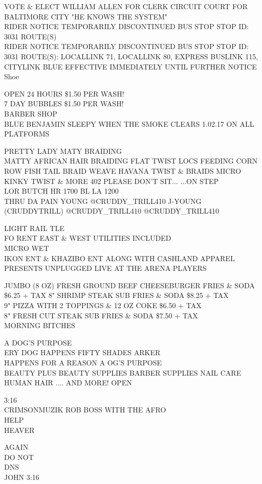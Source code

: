 \documentclass[10pt,letterpaper]{article}
\begin{document}
VOTE \& ELECT WILLIAM ALLEN FOR CLERK CIRCUIT COURT FOR BALTIMORE CITY "HE KNOWS THE SYSTEM"\\
RIDER NOTICE TEMPORARILY DISCONTINUED BUS STOP STOP ID: 3031 ROUTE(S)\\
RIDER NOTICE TEMPORARILY DISCONTINUED BUS STOP STOP ID: 3031 ROUTE(S): LOCALLINK 71, LOCALLINK 80, EXPRESS BUSLINK 115, CITYLINK BLUE EFFECTIVE IMMEDIATELY UNTIL FURTHER NOTICE\\
Shoe

OPEN 24 HOURS \$1.50 PER WASH!\\
7 DAY BUBBLES \$1.50 PER WASH!\\
BARBER SHOP\\
BLUE BENJAMIN SLEEPY WHEN THE SMOKE CLEARS 1.02.17 ON ALL PLATFORMS

PRETTY LADY MATY BRAIDING\\
MATTY AFRICAN HAIR BRAIDING FLAT TWIST LOCS FEEDING CORN ROW FISH TAIL BRAID WEAVE HAVANA TWIST \& BRAIDS MICRO KINKY TWIST \& MORE 402 PLEASE DON'T SIT... ...ON STEP\\
LOR BUTCH HR 1700 BL LA 1200\\
THRU DA PAIN YOUNG @CRUDDY\_TRILL410 J{-}YOUNG (CRUDDYTRILL) @CRUDDY\_TRILL410 @CRUDDY\_TRILL410

LIGHT RAIL TLE\\
FO RENT EAST \& WEST UTILITIES INCLUDED\\
MICRO WET\\
IKON ENT \& KHAZIBO ENT ALONG WITH CASHLAND APPAREL PRESENTS UNPLUGGED LIVE AT THE ARENA PLAYERS

JUMBO (8 OZ) FRESH GROUND BEEF CHEESEBURGER FRIES \& SODA \$6.25 + TAX 8" SHRIMP STEAK SUB FRIES \& SODA \$8.25 + TAX\\
9" PIZZA WITH 2 TOPPINGS \& 12 OZ COKE \$6.50 + TAX\\
8" FRESH CUT STEAK SUB FRIES \& SODA \$7.50 + TAX\\
MORNING BITCHES

A DOG'S PURPOSE\\
ERY DOG HAPPENS FIFTY SHADES ARKER\\
HAPPENS FOR A REASON A OG'S PURPOSE\\
BEAUTY PLUS BEAUTY SUPPLIES BARBER SUPPLIES NAIL CARE HUMAN HAIR .... AND MORE!  OPEN

3:16\\
CRIMSONMUZIK ROB BOSS WITH THE AFRO\\
HELP\\
HEAVER

AGAIN\\
DO NOT\\
DNS\\
JOHN 3:16
\end{document}
